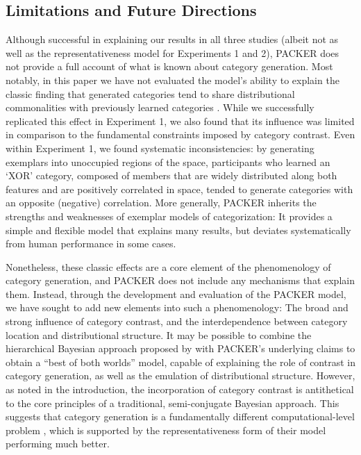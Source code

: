 \documentclass[pdflatex,sn-apa]{sn-jnl}%
\theoremstyle{thmstyleone}%
\theoremstyle{thmstyletwo}%
\theoremstyle{thmstylethree}%
\begin{document}
\subsection{Limitations and Future Directions} 

Although successful in explaining our results in all three studies (albeit not
as well as the representativeness model for Experiments 1 and 2), PACKER does
not provide a full account of what is known about category generation. Most
notably, in this paper we have not evaluated the model's ability to explain the
classic finding that generated categories tend to share distributional
commonalities with previously learned categories
\citep[see][]{jern2013probabilistic,ward1994structured}. While we successfully
replicated this effect in Experiment 1, we also found that its influence was
limited in comparison to the fundamental constraints imposed by category
contrast. Even within Experiment 1, we found systematic inconsistencies: by
generating exemplars into unoccupied regions of the space, participants who
learned an `XOR' category, composed of members that are widely distributed along
both features and are positively correlated in space, tended to generate
categories with an opposite (negative) correlation. More generally, PACKER
inherits the strengths and weaknesses of exemplar models of categorization: It
provides a simple and flexible model that explains many results, but deviates
systematically from human performance in some cases.

Nonetheless, these classic effects are a core element of the phenomenology of
category generation, and PACKER does not include any mechanisms that explain
them. Instead, through the development and evaluation of the PACKER model, we
have sought to add new elements into such a phenomenology: The broad and strong
influence of category contrast, and the interdependence between category
location and distributional structure. It may be possible to combine the
hierarchical Bayesian approach proposed by \cite{jern2013probabilistic} with
PACKER's underlying claims to obtain a ``best of both worlds'' model, capable of
explaining the role of contrast in category generation, as well as the emulation
of distributional structure. However, as noted in the introduction, the
incorporation of category contrast is antithetical to the core principles of a
traditional, semi-conjugate Bayesian approach. This suggests that category
generation is a fundamentally different computational-level problem
\citep[different from those posed by][]{jern2013probabilistic,kemp2014taxonomy}, which is supported by the representativeness form of their model performing much better.
\end{document}
